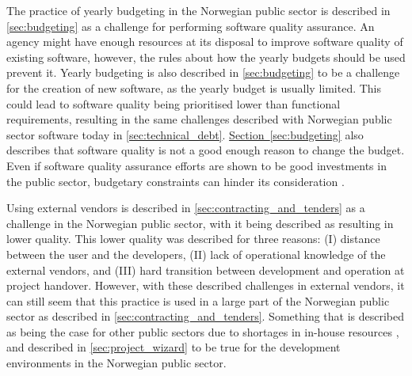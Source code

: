 The practice of yearly budgeting in the Norwegian public sector is described in \autoref{sec:budgeting} as a challenge for performing software quality assurance. An agency might have enough resources at its disposal to improve software quality of existing software, however, the rules about how the yearly budgets should be used prevent it. Yearly budgeting is also described in \autoref{sec:budgeting} to be a challenge for the creation of new software, as the yearly budget is usually limited. This could lead to software quality being prioritised lower than functional requirements, resulting in the same challenges described with Norwegian public sector software today in \autoref{sec:technical_debt}. \hyperref[sec:budgeting]{Section~\ref*{sec:budgeting}} also describes that software quality is not a good enough reason to change the budget. Even if software quality assurance efforts are shown to be good investments in the public sector, budgetary constraints can hinder its consideration \cite{jc_2010}.  


Using external vendors is described in \autoref{sec:contracting_and_tenders} as a challenge in the Norwegian public sector, with it being described as resulting in lower quality. This lower quality was described for three reasons: (I) distance between the user and the developers, (II) lack of operational knowledge of the external vendors, and (III) hard transition between development and operation at project handover. However, with these described challenges in external vendors, it can still seem that this practice is used in a large part of the Norwegian public sector as described in \autoref{sec:contracting_and_tenders}. Something that is described as being the case for other public sectors due to shortages in in-house resources \cite{jc_2010}, and described in \autoref{sec:project_wizard} to be true for the development environments in the Norwegian public sector.

